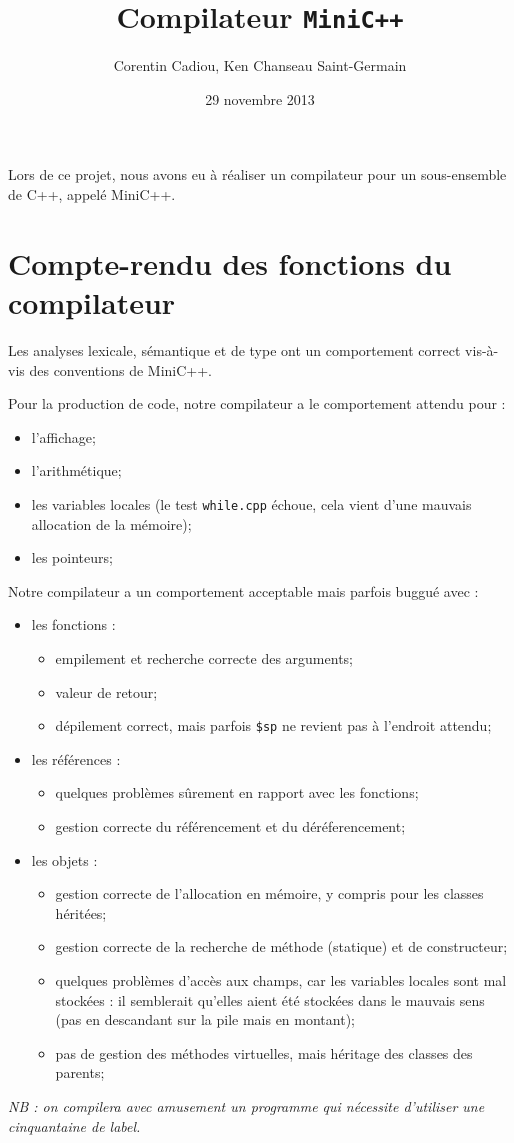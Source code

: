 \documentclass{article}
\title{Compilateur \texttt{MiniC++}}
\author{Corentin Cadiou, Ken Chanseau Saint-Germain}
\date{29 novembre 2013}
\begin{document}
\maketitle
Lors de ce projet, nous avons eu à réaliser un compilateur pour un
sous-ensemble de C++, appelé MiniC++.

\section*{Compte-rendu des fonctions du compilateur}
Les analyses lexicale, sémantique et de type ont un comportement
correct vis-à-vis des conventions de MiniC++.

Pour la production de code, notre compilateur a le comportement attendu pour :
\begin{itemize}
\item l'affichage;
\item l'arithmétique;
\item les variables locales (le test \texttt{while.cpp} échoue, cela vient
  d'une mauvais allocation de la mémoire);
\item les pointeurs;
\end{itemize}

Notre compilateur a un comportement acceptable mais parfois buggué
avec :
\begin{itemize}
\item les fonctions :
  \begin{itemize}
    \item empilement et recherche correcte des arguments;
    \item valeur de retour;
    \item dépilement correct, mais parfois \texttt{\$sp} ne revient pas à l'endroit attendu;
  \end{itemize}
\item les références :
  \begin{itemize}
  \item quelques problèmes sûrement en rapport avec les fonctions;
  \item gestion correcte du référencement et du déréferencement;
  \end{itemize}
\item les objets :
  \begin{itemize}
    \item gestion correcte de l'allocation en mémoire, y compris pour
      les classes héritées;
    \item gestion correcte de la recherche de méthode (statique) et de
      constructeur;
    \item quelques problèmes d'accès aux champs, car les variables
      locales sont mal stockées : il semblerait qu'elles aient été
      stockées dans le mauvais sens (pas en descandant sur la pile
      mais en montant);
    \item pas de gestion des méthodes virtuelles, mais héritage des
      classes des parents;
  \end{itemize}
\end{itemize}

\emph{NB : on compilera avec amusement un programme qui nécessite
  d'utiliser une cinquantaine de label.}
\end{document}
